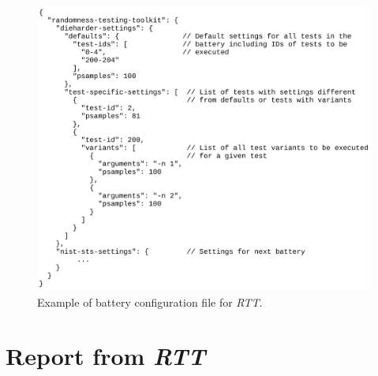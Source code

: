 \documentclass[
  digital,     %
  oneside,     %
  nosansbold,  %
  nocolorbold, %
  nolof,         %
  nolot,         %
]{fithesis4}
\begin{document}
\begin{figure}[h!]
  \begin{center}
    \includegraphics[width=12.5cm]{figures/rtt/config.jpg}
  \end{center}
  \caption{Example of battery configuration file for \emph{RTT}.}
  \label{fig:rtt_config}
\end{figure}

\newpage

\section{Report from \emph{RTT}} \label{append:rtt-output}
\end{document}
